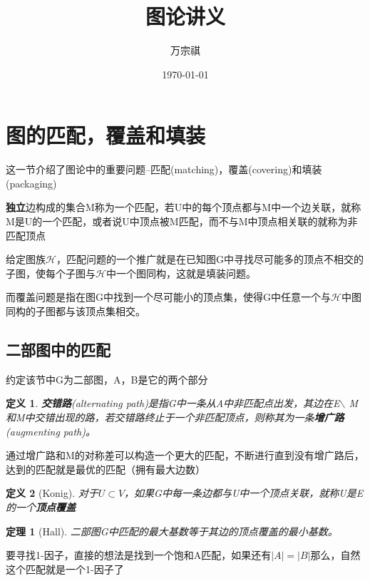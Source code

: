 \documentclass[UTF8]{ctexart}
\title{图论讲义}
\author{万宗祺}
\date{\today}
\newtheorem{dfnt}{定义}
\newtheorem{thr}{定理}
\begin{document}
\maketitle
\tableofcontents
\section{图的匹配，覆盖和填装}
这一节介绍了图论中的重要问题--匹配(matching)，覆盖(covering)和填装(packaging)

\textbf{独立}边构成的集合M称为一个匹配，若U中的每个顶点都与M中一个边关联，就称M是U的一个匹配，或者说U中顶点被M匹配，而不与M中顶点相关联的就称为非匹配顶点

给定图族$\mathscr{H}$，匹配问题的一个推广就是在已知图G中寻找尽可能多的顶点不相交的子图，使每个子图与$\mathscr{H}$中一个图同构，这就是填装问题。

而覆盖问题是指在图G中找到一个尽可能小的顶点集，使得G中任意一个与$\mathscr{H}$中图同构的子图都与该顶点集相交。

\subsection{二部图中的匹配}
约定该节中G为二部图，A，B是它的两个部分
\begin{dfnt}
\textbf{交错路}(alternating path)是指G中一条从A中非匹配点出发，其边在E$\backslash$ M和M中交错出现的路，若交错路终止于一个非匹配顶点，则称其为一条\textbf{增广路}(augmenting path)。
\end{dfnt}

通过增广路和M的对称差可以构造一个更大的匹配，不断进行直到没有增广路后，达到的匹配就是最优的匹配（拥有最大边数）
 
\begin{dfnt}[Konig]
对于$U \subset V$，如果G中每一条边都与U中一个顶点关联，就称U是E的一个\textbf{顶点覆盖}
\end{dfnt}
\begin{thr}[Hall]
二部图G中匹配的最大基数等于其边的顶点覆盖的最小基数。
\end{thr}


要寻找1-因子，直接的想法是找到一个饱和A匹配，如果还有$|A|=|B|$那么，自然这个匹配就是一个1-因子了
\end{document}
